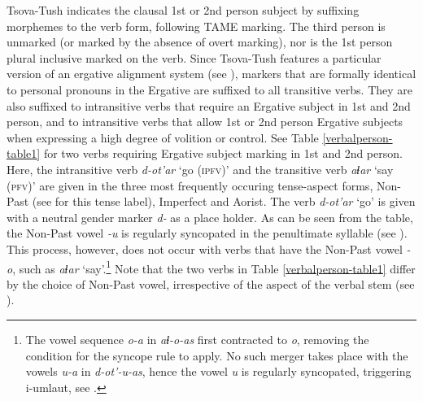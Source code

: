 Tsova-Tush indicates the clausal 1st or 2nd person subject by suffixing morphemes to the verb form, following TAME marking. The third person is unmarked (or marked by the absence of overt marking), nor is the 1st person plural inclusive marked on the verb. Since Tsova-Tush features a particular version of an ergative alignment system (see ), markers that are formally identical to personal pronouns in the Ergative are suffixed to all transitive verbs. They are also suffixed to intransitive verbs that require an Ergative subject in 1st and 2nd person, and to intransitive verbs that allow 1st or 2nd person Ergative subjects when expressing a high degree of volition or control. See Table \ref{verbalperson-table1} for two verbs requiring Ergative subject marking in 1st and 2nd person. Here, the intransitive verb \textit{d-ot'ar} `go (\textsc{ipfv})' and the transitive verb \textit{aɬar} `say (\textsc{pfv})' are given in the three most frequently occuring tense-aspect forms, Non-Past (see  for this tense label), Imperfect and Aorist. The verb \textit{d-ot'ar} `go' is given with a neutral gender marker \textit{d-} as a place holder. As can be seen from the table, the Non-Past vowel \textit{-u} is regularly syncopated in the penultimate syllable (see ). This process, however, does not occur with verbs that have the Non-Past vowel \textit{-o}, such as \textit{aɬar} `say'.\footnote{The vowel sequence \textit{o-a} in \textit{aɬ-o-as} first contracted to \textit{o}, removing the condition for the syncope rule to apply. No such merger takes place with the vowels \textit{u-a} in \textit{d-ot'-u-as}, hence the vowel \textit{u} is regularly syncopated, triggering i-umlaut, see .} Note that the two verbs in Table \ref{verbalperson-table1} differ by the choice of Non-Past vowel, irrespective of the aspect of the verbal stem (see ).




